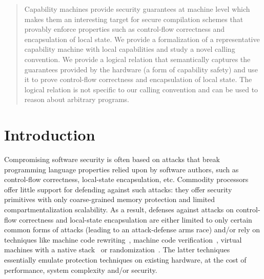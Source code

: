 \documentclass[format=acmsmall, review=false, screen=true]{acmart}
\begin{document}
\author{Lars~Birkedal}

\maketitle

\begin{abstract}
  Capability machines provide security guarantees at machine level which makes
  them an interesting target for secure compilation schemes that provably
  enforce properties such as control-flow correctness and encapsulation of local
  state. We provide a formalization of a representative capability machine with
  local capabilities and study a novel calling convention.  We provide a logical
  relation that semantically captures the guarantees provided by the hardware (a
  form of capability safety) and use it to prove control-flow correctness and
  encapsulation of local state.  The logical relation is not specific to our
  calling convention and can be used to reason about arbitrary programs.
\end{abstract}



\section{Introduction}
\label{sec:introduction}

Compromising software security is often based on attacks that break programming
language properties relied upon by software authors, such as control-flow
correctness, local-state encapsulation, etc. Commodity processors offer little
support for defending against such attacks: they offer security primitives with
only coarse-grained memory protection and limited compartmentalization
scalability. As a result, defenses against attacks on control-flow correctness
and local-state encapsulation are either limited to only certain common forms of
attacks (leading to an attack-defense arms race) and/or rely on techniques like
machine code rewriting~\citep{wahbe_efficient_1993,abadi_control-flow_2005}, machine code
verification~\citep{morrisett_system_1999}, virtual machines with a
native stack~\citep{lindholm_java_2014} or
randomization~\citep{forrest_building_1997}. The latter techniques essentially
emulate protection techniques on existing hardware, at the cost of performance,
system complexity and/or security.
\end{document}
